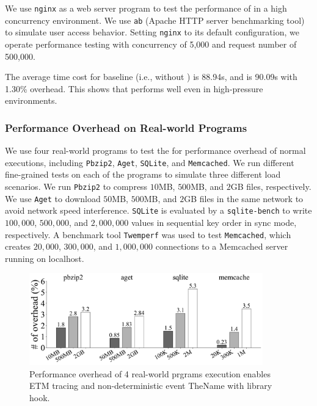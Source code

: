 We use \texttt{nginx} \cite{nginx_1.20.0} as a web server program to test the
performance of \TheName in a high concurrency environment. We use \texttt{ab}
(Apache HTTP server benchmarking tool) \cite{ApacheBench} to simulate user
access behavior. Setting \texttt{nginx} to its default configuration, we operate
performance testing with concurrency of 5,000 and request number of 500,000.

The average time cost for baseline (i.e., without \TheName) is 88.94s, and
\TheName is 90.09s with 1.30\% overhead. This shows that \TheName performs well
even in high-pressure environments.

\subsubsection{Performance Overhead on Real-world Programs} \label{subsec:eva-Performance-Normal}

We use four real-world programs to test the \TheName for performance overhead of
normal executions, including \texttt{Pbzip2}, \texttt{Aget}, \texttt{SQLite},
and \texttt{Memcached}. We run different fine-grained tests on each of the
programs to simulate three different load scenarios. We run \texttt{Pbzip2} to
compress $10$MB, $500$MB, and $2$GB files, respectively. We use \texttt{Aget} to
download $50$MB, $500$MB, and $2$GB files in the same network to
avoid network speed interference. \texttt{SQLite} is evaluated by a
\texttt{sqlite-bench} \cite{sqlitebench} to write $100,000$, $500,000$, and
$2,000,000$ values in sequential key order in sync mode, respectively. A
benchmark tool \texttt{Twemperf} \cite{twemperf} was used to test
\texttt{Memcached}, which creates $20,000$, $300,000$, and $1,000,000$
connections to a Memcached server running on localhost.

\begin{figure}
    \centering
    \includegraphics[width=0.9\textwidth]{figures/normaloverheadbar.pdf}
    \caption{Performance overhead of 4 real-world prgrams execution enables ETM tracing and non-deterministic event TheName with library hook.}
    \label{fig:Performance overhead of Normal Execution}
\end{figure}


